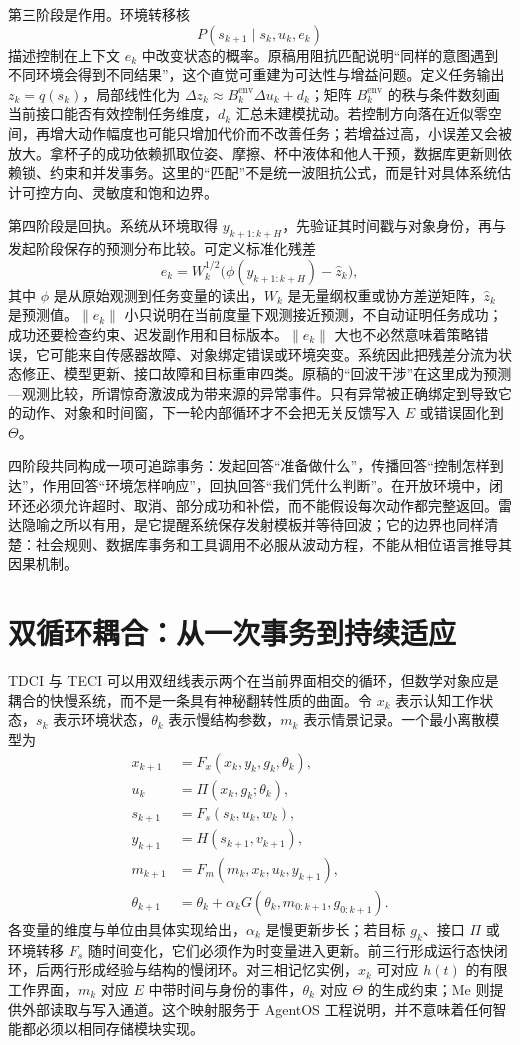 第三阶段是作用。环境转移核
\[
P(s_{k+1}\mid s_k,u_k,e_k)
\]
描述控制在上下文 $e_k$ 中改变状态的概率。原稿用阻抗匹配说明“同样的意图遇到不同环境会得到不同结果”，这个直觉可重建为可达性与增益问题。定义任务输出 $z_k=q(s_k)$，局部线性化为 $\Delta z_k\approx B_k^{\mathrm{env}}\Delta u_k+d_k$；矩阵 $B_k^{\mathrm{env}}$ 的秩与条件数刻画当前接口能否有效控制任务维度，$d_k$ 汇总未建模扰动。若控制方向落在近似零空间，再增大动作幅度也可能只增加代价而不改善任务；若增益过高，小误差又会被放大。拿杯子的成功依赖抓取位姿、摩擦、杯中液体和他人干预，数据库更新则依赖锁、约束和并发事务。这里的“匹配”不是统一波阻抗公式，而是针对具体系统估计可控方向、灵敏度和饱和边界。

第四阶段是回执。系统从环境取得 $y_{k+1:k+H}$，先验证其时间戳与对象身份，再与发起阶段保存的预测分布比较。可定义标准化残差
\[
e_k=W_k^{1/2}\bigl(\phi(y_{k+1:k+H})-\hat z_k\bigr),
\]
其中 $\phi$ 是从原始观测到任务变量的读出，$W_k$ 是无量纲权重或协方差逆矩阵，$\hat z_k$ 是预测值。$\|e_k\|$ 小只说明在当前度量下观测接近预测，不自动证明任务成功；成功还要检查约束、迟发副作用和目标版本。$\|e_k\|$ 大也不必然意味着策略错误，它可能来自传感器故障、对象绑定错误或环境突变。系统因此把残差分流为状态修正、模型更新、接口故障和目标重审四类。原稿的“回波干涉”在这里成为预测—观测比较，所谓惊奇激波成为带来源的异常事件。只有异常被正确绑定到导致它的动作、对象和时间窗，下一轮内部循环才不会把无关反馈写入 $E$ 或错误固化到 $\Theta$。

四阶段共同构成一项可追踪事务：发起回答“准备做什么”，传播回答“控制怎样到达”，作用回答“环境怎样响应”，回执回答“我们凭什么判断”。在开放环境中，闭环还必须允许超时、取消、部分成功和补偿，而不能假设每次动作都完整返回。雷达隐喻之所以有用，是它提醒系统保存发射模板并等待回波；它的边界也同样清楚：社会规则、数据库事务和工具调用不必服从波动方程，不能从相位语言推导其因果机制。

\section{双循环耦合：从一次事务到持续适应}
\label{sec:section_4121}

TDCI 与 TECI 可以用双纽线表示两个在当前界面相交的循环，但数学对象应是耦合的快慢系统，而不是一条具有神秘翻转性质的曲面。令 $x_k$ 表示认知工作状态，$s_k$ 表示环境状态，$\theta_k$ 表示慢结构参数，$m_k$ 表示情景记录。一个最小离散模型为
\[
\begin{aligned}
x_{k+1}&=F_x(x_k,y_k,g_k,\theta_k),\\
u_k&=\Pi(x_k,g_k;\theta_k),\\
s_{k+1}&=F_s(s_k,u_k,w_k),\\
y_{k+1}&=H(s_{k+1},v_{k+1}),\\
m_{k+1}&=F_m(m_k,x_k,u_k,y_{k+1}),\\
\theta_{k+1}&=\theta_k+\alpha_k G(\theta_k,m_{0:k+1},g_{0:k+1}).
\end{aligned}
\]
各变量的维度与单位由具体实现给出，$\alpha_k$ 是慢更新步长；若目标 $g_k$、接口 $\Pi$ 或环境转移 $F_s$ 随时间变化，它们必须作为时变量进入更新。前三行形成运行态快闭环，后两行形成经验与结构的慢闭环。对三相记忆实例，$x_k$ 可对应 $h(t)$ 的有限工作界面，$m_k$ 对应 $E$ 中带时间与身份的事件，$\theta_k$ 对应 $\Theta$ 的生成约束；Me 则提供外部读取与写入通道。这个映射服务于 AgentOS 工程说明，并不意味着任何智能都必须以相同存储模块实现。

